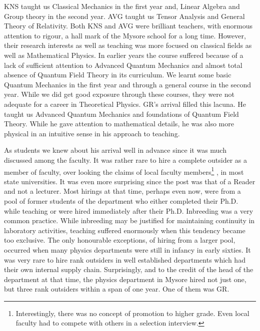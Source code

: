 KNS taught us Classical Mechanics in the first year and, Linear Algebra and Group theory in the second year. AVG taught us Tensor Analysis and General Theory of Relativity. Both KNS and AVG were brilliant teachers, with enormous attention to rigour, a hall mark of the Mysore school for a long time. However, their research interests as well as teaching was more focused on classical fields as well as Mathematical Physics. In earlier years the course suffered because of a lack of sufficient attention to Advanced Quantum Mechanics and almost total absence of Quantum Field Theory in its curriculum. We learnt some basic Quantum Mechanics in the first year and through a general course in the second year. While we did get good exposure through these courses, they were not adequate for a career in Theoretical Physics. GR’s arrival filled this lacuna. He taught us Advanced Quantum Mechanics and foundations of Quantum Field Theory. While he gave attention to mathematical details, he was also more physical in an intuitive sense in his approach to teaching.

As students we knew about his arrival well in advance since it was much discussed among the faculty. It was rather rare to hire a complete outsider as a member of faculty, over looking the claims of local faculty members\footnote{Interestingly, there was no concept of promotion to higher grade. Even local faculty had to compete with others in a selection interview.} , in most state universities. It was even more surprising since the post was that of a Reader and not a lecturer. Most hirings at that time, perhaps even now, were from a pool of former students of the department who either completed their Ph.D. while teaching or were hired immediately after their Ph.D. Inbreeding was a very common practice. While inbreeding may be justified for maintaining continuity in laboratory activities, teaching suffered enormously when this tendency became too exclusive. The only honourable exceptions, of hiring from a larger pool, occurred when many physics departments were still in infancy in early sixties. It was very rare to hire rank outsiders in well established departments which had their own internal supply chain. Surprisingly, and to the credit of the head of the department at that time, the physics department in Mysore hired not just one, but three rank outsiders within a span of one year. One of them was GR.

